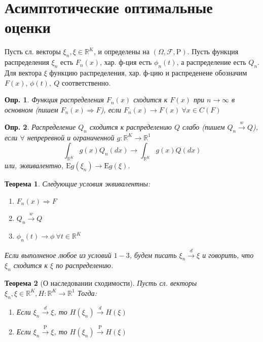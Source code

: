 \documentclass[12pt]{article}
\newtheorem{definition}{Опр.}
\theoremstyle{basic_theorem}
\newtheorem{theorem}{Теорема}
\theoremstyle{name_theorem}
\def\R{
    \mathbb{R}
}
\def\E{
    \mathrm{E}
}
\def\P{
    \mathrm{P}
}
\begin{document}
\section{Асимптотические оптимальные оценки}
    Пусть сл. векторы $\xi_n, \xi \in \R^K$, и определены на $(\Omega, \mathcal{F}, \P)$.
Пусть функция распределения $\xi_n$ есть $F_n(x)$, хар. ф-ция есть $\phi_n(t)$, а распределение
есть $Q_n$. Для вектора $\xi$ функцию распределения, хар. ф-цию и распреденеие обозначим $F(x)$,
$\phi(t),\ Q$ соответственно.

\begin{definition}
    Функция распределения $F_n(x)$ сходится к $F(x)$ при $n \rightarrow \infty$ в основном
    (пишем $F_n(x) \Rightarrow F$), если $F_n(x) \rightarrow F(x) \ \forall x \in C(F)$
\end{definition}

\begin{definition}
    Распределение $Q_n$ сходится к распределению $Q$ слабо (пишем $Q_n \xrightarrow{w} Q$),
    если $\forall$ непреревной и ограниченной $g: \R^K \rightarrow \R^1$
    $$ \int_{\R^K} g(x)Q_n(dx) \rightarrow \int_{\R^K} g(x)Q(dx)$$
    или, эквивалентно, $\E g(\xi_n) \rightarrow \E g(\xi)$.
\end{definition}

\begin{theorem}
    Следующие условия эквивалентны:
    \begin{enumerate}
        \item $F_n(x) \Rightarrow F$
        \item $Q_n \xrightarrow{w} Q$
        \item $\phi_n(t) \rightarrow \phi \ \forall t \in \R^K$
    \end{enumerate}
    Если выполненое любое из условий $1 - 3$, будем писать
    $\xi_n \xrightarrow{d} \xi$ и говорить, что $\xi_n$ сходится к $\xi$ по распределению.
\end{theorem}

\begin{theorem}[О наследовании сходимости]
\label{th::inherit_conv}
    Пусть сл. векторы $\xi_n, \xi \in \R^K, H: \R^K \rightarrow \R^1$ 
    Тогда:
    \begin{enumerate}
        \item Если $\xi_n \xrightarrow{d} \xi$, то $H(\xi_n) \xrightarrow{d} H(\xi)$
        \item Если $\xi_n \xrightarrow{\P} \xi$, то $H(\xi_n) \xrightarrow{\P} H(\xi)$
    \end{enumerate}
\end{theorem}
\end{document}
